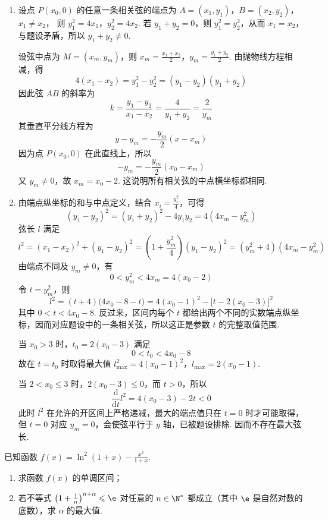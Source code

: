 \begin{solution}
\begin{enumerate}
\item 设点 \(P(x_0,0)\) 的任意一条相关弦的端点为
\(A=(x_1,y_1)\)，\(B=(x_2,y_2)\)，\(x_1\ne x_2\)，
则 \(y_1^2=4x_1\)，\(y_2^2=4x_2\). 若 \(y_1+y_2=0\)，则 \(y_1^2=y_2^2\)，从而 \(x_1=x_2\)，与题设矛盾，所以 \(y_1+y_2\ne0\).

设弦中点为 \(M=(x_m,y_m)\)，则
\(x_m=\frac{x_1+x_2}{2}\)，\(y_m=\frac{y_1+y_2}{2}\).
由抛物线方程相减，得
\[
4(x_1-x_2)=y_1^2-y_2^2=(y_1-y_2)(y_1+y_2)
\]
因此弦 \(AB\) 的斜率为
\[
k=\frac{y_1-y_2}{x_1-x_2}=\frac4{y_1+y_2}=\frac2{y_m}
\]
其垂直平分线方程为
\[
y-y_m=-\frac{y_m}{2}(x-x_m)
\]
因为点 \(P(x_0,0)\) 在此直线上，所以
\[
-y_m=-\frac{y_m}{2}(x_0-x_m)
\]
又 \(y_m\ne0\)，故 \(x_m=x_0-2\). 这说明所有相关弦的中点横坐标都相同.
\item 由端点纵坐标的和与中点定义，结合 \(x_i=\frac{y_i^2}{4}\)，可得
\[
(y_1-y_2)^2=(y_1+y_2)^2-4y_1y_2
=4(4x_m-y_m^2)
\]
弦长 \(l\) 满足
\[
l^2=(x_1-x_2)^2+(y_1-y_2)^2
=\left(1+\frac{y_m^2}{4}\right)(y_1-y_2)^2
=(y_m^2+4)(4x_m-y_m^2)
\]
由端点不同及 \(y_m\ne0\)，有
\[
0<y_m^2<4x_m=4(x_0-2)
\]
令 \(t=y_m^2\)，则
\[
l^2=(t+4)\bigl(4x_0-8-t\bigr)
=4(x_0-1)^2-\bigl[t-2(x_0-3)\bigr]^2
\]
其中 \(0<t<4x_0-8\). 反过来，区间内每个 \(t\) 都给出两个不同的实数端点纵坐标，因而对应题设中的一条相关弦，所以这正是参数 \(t\) 的完整取值范围.

当 \(x_0>3\) 时，\(t_0=2(x_0-3)\) 满足
\[
0<t_0<4x_0-8
\]
故在 \(t=t_0\) 时取得最大值
\(l_{\max}^2=4(x_0-1)^2\)，\(l_{\max}=2(x_0-1)\).

当 \(2<x_0\leqslant3\) 时，\(2(x_0-3)\leqslant0\)，而 \(t>0\)，所以
\[
\frac{\mathrm d}{\mathrm dt}l^2=4(x_0-3)-2t<0
\]
此时 \(l^2\) 在允许的开区间上严格递减，最大的端点值只在 \(t=0\) 时才可能取得，但 \(t=0\) 对应 \(y_m=0\)，会使弦平行于 \(y\) 轴，已被题设排除. 因而不存在最大弦长.
\end{enumerate}
\end{solution}

\begin{problem}
已知函数 \( f(x) = \ln^2 (1 + x) - \frac{x^2}{1 + x} \).
\begin{enumerate}
\item 求函数 \( f(x) \) 的单调区间；
\item 若不等式 \(\left(1 + \frac{1}{n}\right)^{n + \alpha} \leqslant \e\) 对任意的 \(n \in \N^*\) 都成立（其中 \(\e\) 是自然对数的底数），求 \(\alpha\) 的最大值.
\end{enumerate}
\end{problem}

